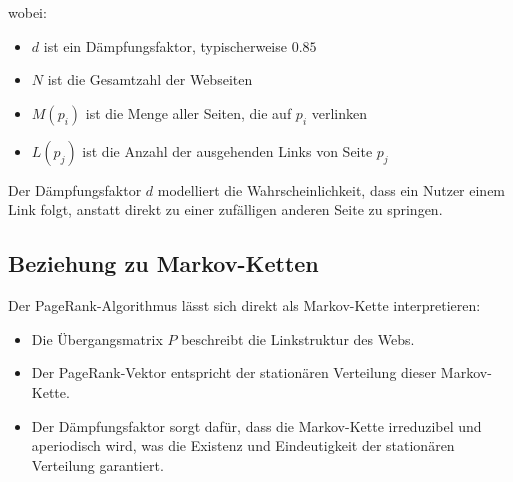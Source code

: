 wobei:
\begin{itemize}
    \item $d$ ist ein Dämpfungsfaktor, typischerweise $0.85$
    \item $N$ ist die Gesamtzahl der Webseiten
    \item $M(p_i)$ ist die Menge aller Seiten, die auf $p_i$ verlinken
    \item $L(p_j)$ ist die Anzahl der ausgehenden Links von Seite $p_j$
\end{itemize}

Der Dämpfungsfaktor $d$ modelliert die Wahrscheinlichkeit, dass ein Nutzer einem Link folgt, anstatt direkt zu einer zufälligen anderen Seite zu springen.

\subsection{Beziehung zu Markov-Ketten}

Der PageRank-Algorithmus lässt sich direkt als Markov-Kette interpretieren:

\begin{itemize}
    \item Die Übergangsmatrix $P$ beschreibt die Linkstruktur des Webs.
    \item Der PageRank-Vektor entspricht der stationären Verteilung dieser Markov-Kette.
    \item Der Dämpfungsfaktor sorgt dafür, dass die Markov-Kette irreduzibel und aperiodisch wird, was die Existenz und Eindeutigkeit der stationären Verteilung garantiert.
\end{itemize}


